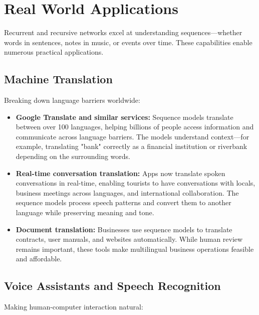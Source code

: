 
\section{Real World Applications}
\label{sec:sequence-real-world}

Recurrent and recursive networks excel at understanding sequences—whether words in sentences, notes in music, or events over time. These capabilities enable numerous practical applications.

\subsection{Machine Translation}

Breaking down language barriers worldwide:

\begin{itemize}
    \item \textbf{Google Translate and similar services:} Sequence models translate between over 100 languages, helping billions of people access information and communicate across language barriers. The models understand context—for example, translating "bank" correctly as a financial institution or riverbank depending on the surrounding words.
    
    \item \textbf{Real-time conversation translation:} Apps now translate spoken conversations in real-time, enabling tourists to have conversations with locals, business meetings across languages, and international collaboration. The sequence models process speech patterns and convert them to another language while preserving meaning and tone.
    
    \item \textbf{Document translation:} Businesses use sequence models to translate contracts, user manuals, and websites automatically. While human review remains important, these tools make multilingual business operations feasible and affordable.
\end{itemize}

\subsection{Voice Assistants and Speech Recognition}

Making human-computer interaction natural:

